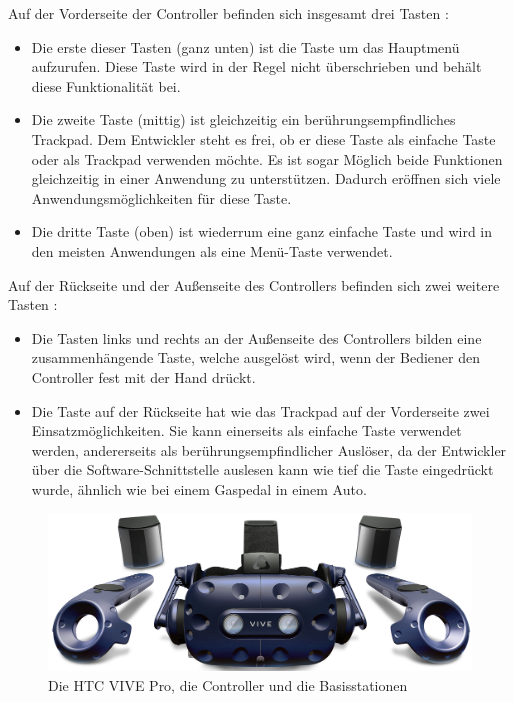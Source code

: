 Auf der Vorderseite der Controller befinden sich insgesamt drei Tasten \cite{29}:
\begin{itemize}
	\item Die erste dieser Tasten (ganz unten) ist die Taste um das Hauptmenü aufzurufen. Diese 
	Taste wird in der Regel nicht überschrieben und behält diese Funktionalität bei.
	\item Die zweite Taste (mittig) ist gleichzeitig ein berührungsempfindliches Trackpad. Dem 
	Entwickler steht es frei, ob er diese Taste als einfache Taste oder als Trackpad verwenden 
	möchte. Es ist sogar Möglich beide Funktionen gleichzeitig in einer Anwendung zu 
	unterstützen. Dadurch eröffnen sich viele Anwendungsmöglichkeiten für diese Taste.
	\item Die dritte Taste (oben) ist wiederrum eine ganz einfache Taste und wird in den meisten 
	Anwendungen als eine Menü-Taste verwendet.
\end{itemize}
Auf der Rückseite und der Außenseite des Controllers befinden sich zwei weitere Tasten \cite{29}:
\begin{itemize}
	\item Die Tasten links und rechts an der Außenseite des Controllers bilden eine zusammenhängende Taste, welche ausgelöst wird, wenn der Bediener den Controller fest mit der Hand drückt.
	\item Die Taste auf der Rückseite hat wie das Trackpad auf der Vorderseite zwei 
	Einsatzmöglichkeiten. Sie kann einerseits als einfache Taste verwendet werden, andererseits 
	als berührungsempfindlicher Auslöser, da der Entwickler über die Software-Schnittstelle 
	auslesen kann wie tief die Taste eingedrückt wurde, ähnlich wie bei einem Gaspedal in
	einem Auto.
\end{itemize}
\begin{figure}[h]
	\centering
	\includegraphics[width=0.6\linewidth]{Bilder/A26_Vivepro2}
	\caption{Die HTC VIVE Pro, die Controller und die Basisstationen \cite{A26}}
	\label{fig:ViveproKit}
\end{figure}
